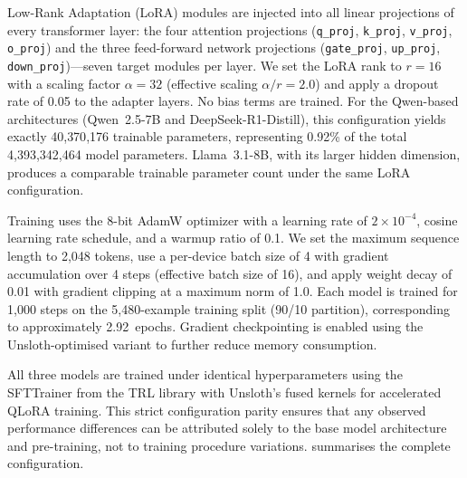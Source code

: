 \documentclass[runningheads]{llncs}
\begin{document}
Low-Rank Adaptation (LoRA) modules are injected into all linear projections of every transformer layer: the four attention projections (\texttt{q\_proj}, \texttt{k\_proj}, \texttt{v\_proj}, \texttt{o\_proj}) and the three feed-forward network projections (\texttt{gate\_proj}, \texttt{up\_proj}, \texttt{down\_proj})---seven target modules per layer. We set the LoRA rank to $r{=}16$ with a scaling factor $\alpha{=}32$ (effective scaling $\alpha/r{=}2.0$) and apply a dropout rate of 0.05 to the adapter layers. No bias terms are trained. For the Qwen-based architectures (Qwen~2.5-7B and DeepSeek-R1-Distill), this configuration yields exactly 40{,}370{,}176 trainable parameters, representing 0.92\% of the total 4{,}393{,}342{,}464 model parameters. Llama~3.1-8B, with its larger hidden dimension, produces a comparable trainable parameter count under the same LoRA configuration.

Training uses the 8-bit AdamW optimizer with a learning rate of $2{\times}10^{-4}$, cosine learning rate schedule, and a warmup ratio of 0.1. We set the maximum sequence length to 2{,}048 tokens, use a per-device batch size of 4 with gradient accumulation over 4 steps (effective batch size of 16), and apply weight decay of 0.01 with gradient clipping at a maximum norm of 1.0. Each model is trained for 1{,}000 steps on the 5{,}480-example training split (90/10 partition), corresponding to approximately 2.92~epochs. Gradient checkpointing is enabled using the Unsloth-optimised variant to further reduce memory consumption.

All three models are trained under identical hyperparameters using the SFTTrainer from the TRL library with Unsloth's fused kernels for accelerated QLoRA training. This strict configuration parity ensures that any observed performance differences can be attributed solely to the base model architecture and pre-training, not to training procedure variations.  summarises the complete configuration.
\end{document}
